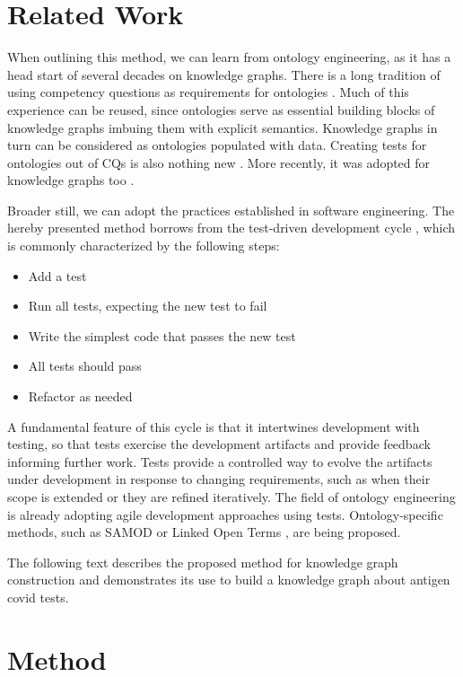 \documentclass[
]{ceurart}
\begin{document}
\section{Related Work}
When outlining this method, we can learn from ontology engineering, as it has a head start of several decades on knowledge graphs. There is a long tradition of using competency questions as requirements for ontologies \cite{Gruninger1994}. Much of this experience can be reused, since ontologies serve as essential building blocks of knowledge graphs imbuing them with explicit semantics. Knowledge graphs in turn can be considered as ontologies populated with data. Creating tests for ontologies out of CQs is also nothing new \cite{Ren2014,Zemmouchi2013}. More recently, it was adopted for knowledge graphs too \cite{Pan2017}.

Broader still, we can adopt the practices established in software engineering. The hereby presented method borrows from the test-driven development cycle \cite{Beck2003}, which is commonly characterized by the following steps:
\begin{itemize}
    \item Add a test
    \item Run all tests, expecting the new test to fail
    \item Write the simplest code that passes the new test
    \item All tests should pass
    \item Refactor as needed
\end{itemize}

A fundamental feature of this cycle is that it intertwines development with testing, so that tests exercise the development artifacts and provide feedback informing further work. Tests provide a controlled way to evolve the artifacts under development in response to changing requirements, such as when their scope is extended or they are refined iteratively. The field of ontology engineering is already adopting agile development approaches using tests. Ontology-specific methods, such as SAMOD \cite{Peroni2016} or Linked Open Terms \cite{PovedaVillalon2022}, are being proposed.

The following text describes the proposed method for knowledge graph construction and demonstrates its use to build a knowledge graph about antigen covid tests.

\section{Method}

\end{document}
